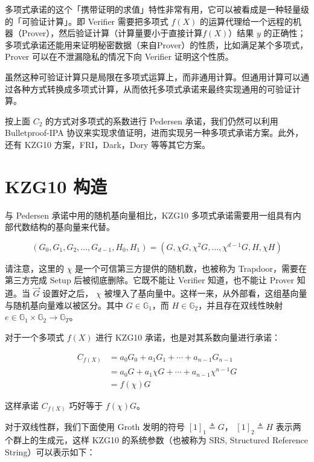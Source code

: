 多项式承诺的这个「携带证明的求值」特性非常有用，它可以被看成是一种轻量级的「可验证计算」。即
Verifier 需要把多项式 \(f(X)\)
的运算代理给一个远程的机器（Prover），然后验证计算（计算量要小于直接计算\(f(X)\)）结果
\(y\)
的正确性；多项式承诺还能用来证明秘密数据（来自Prover）的性质，比如满足某个多项式，Prover
可以在不泄漏隐私的情况下向 Verifier 证明这个性质。

虽然这种可验证计算只是局限在多项式运算上，而非通用计算。但通用计算可以通过各种方式转换成多项式计算，从而依托多项式承诺来最终实现通用的可验证计算。

按上面 \(C_2\) 的方式对多项式的系数进行 Pedersen 承诺，我们仍然可以利用
Bulletproof-IPA
协议来实现求值证明，进而实现另一种多项式承诺方案。此外，还有 KZG10
方案，FRI，Dark，Dory 等等其它方案。

\hypertarget{kzg10-ux6784ux9020}{%
\section{KZG10 构造}\label{kzg10-ux6784ux9020}}

与 Pedersen 承诺中用的随机基向量相比，KZG10
多项式承诺需要用一组具有内部代数结构的基向量来代替。

\[
(G_0, G_1, G_2, \ldots, G_{d-1}, H_0, H_1) = (G, \chi G, \chi^2G, \ldots, \chi^{d-1}G, H, \chi H)
\]

请注意，这里的 \(\chi\) 是一个可信第三方提供的随机数，也被称为
Trapdoor，需要在第三方完成 Setup 后被彻底删除。它既不能让 Verifier
知道，也不能让 Prover 知道。当 \(\vec{G}\) 设置好之后， \(\chi\)
被埋入了基向量中。这样一来，从外部看，这组基向量与随机基向量难以被区分。其中
\(G\in\mathbb{G}_1\)，而 \(H\in\mathbb{G}_2\)，并且存在双线性映射
\(e\in \mathbb{G}_1\times\mathbb{G}_2\to \mathbb{G}_T\)。

对于一个多项式 \(f(X)\) 进行 KZG10 承诺，也是对其系数向量进行承诺：

\[
\begin{split}
C_{f(X)} &= a_0 G_0 + a_1  G_1 + \cdots + a_{n-1} G_{n-1} \\
 & = a_0  G + a_1 \chi G + \cdots + a_{n-1}\chi^{n-1} G\\
 & = f(\chi) G
\end{split}
\]

这样承诺 \(C_{f(X)}\) 巧好等于 \(f(\chi) G\)。

对于双线性群，我们下面使用 Groth 发明的符号 \([1]_1\triangleq G\)，
\([1]_2\triangleq H\) 表示两个群上的生成元，这样 KZG10
的系统参数（也被称为 SRS, Structured Reference String）可以表示如下：

